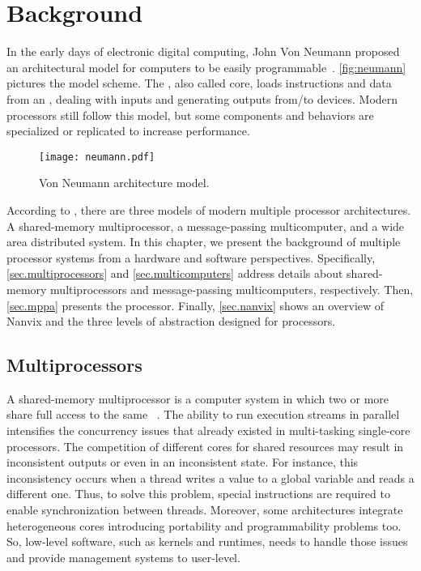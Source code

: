 \chapter{Background}
\label{ch.fundamentation}

	In the early days of electronic digital computing, John Von Neumann
	proposed an architectural model for computers to be easily programmable~\cite{von-neumann:model}.
	\autoref{fig:neumann} pictures the model scheme.
	The \cpu, also called core, loads instructions and data from an \mmu,
	dealing with inputs and generating outputs from/to \io devices.
	Modern processors still follow this model, but some components and
	behaviors are specialized or replicated to increase performance.

	\begin{figure}[!tb]
		\centering%
		\caption{Von Neumann architecture model.}%
		\label{fig:neumann}%
		\texttt{[image: neumann.pdf]}%
	\end{figure}
	
	According to , there are three models of
	modern multiple processor architectures.
	A shared-memory multiprocessor, a message-passing multicomputer, and a wide
	area distributed system.
	In this chapter, we present the background of multiple processor systems from
	a hardware and software perspectives.
	Specifically, \autoref{sec.multiprocessors} and \autoref{sec.multicomputers} address
	details about shared-memory multiprocessors and message-passing multicomputers, respectively.
	Then, \autoref{sec.mppa} presents the \mppa processor.
	Finally, \autoref{sec.nanvix} shows an overview of Nanvix \os and the
	three levels of abstraction designed for \lightweight \manycores processors.

	\section{Multiprocessors}
	\label{sec.multiprocessors}

		A shared-memory multiprocessor is a computer system in which two or more \cpus
		share full access to the same \ram~\cite{tanenbaum:4ed}.
		The ability to run execution streams in parallel intensifies the concurrency
		issues that already existed in multi-tasking single-core processors.
		The competition of different cores for shared resources may result in
		inconsistent outputs or even in an inconsistent \os state.
		For instance, this inconsistency occurs when a thread writes a value to a global variable and
		reads a different one. Thus, to solve this problem, special
		instructions are required to enable synchronization between
		threads.
		Moreover, some architectures integrate heterogeneous cores introducing
		portability and programmability problems too.
		So, low-level software, such as \os kernels and runtimes, needs to handle
		those issues and provide management systems to user-level.

